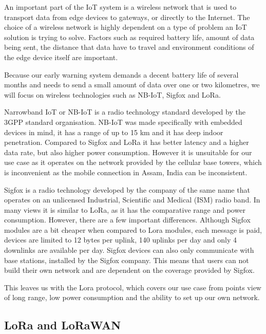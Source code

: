 An important part of the IoT system is a wireless network that is used to transport data from edge devices to gateways, or directly to the Internet.
The choice of a wireless network is highly dependent on a type of problem an IoT solution is trying to solve.
Factors such as required battery life, amount of data being sent, the distance that data have to travel and environment conditions of the edge device itself are important.

Because our early warning system demands a decent battery life of several months and needs to send a small amount of data over one or two kilometres, we will focus on wireless technologies such as NB-IoT, Sigfox and LoRa.

Narrowband IoT or NB-IoT is a radio technology standard developed by the 3GPP standard organisation\cite{lora_nbiot}.
NB-IoT was made specifically with embedded devices in mind, it has a range of up to 15 \si{\kilo\meter} and it has deep indoor penetration\cite{lora_nbiot}.
Compared to Sigfox and LoRa it has better latency and a higher data rate, but also higher power consumption\cite{lora_nbiot_sigfox}.
However it is unsuitable for our use case as it operates on the network provided by the cellular base towers, which is inconvenient as the mobile connection in Assam, India can be inconsistent\cite{wildlabs-elephants}.

Sigfox is a radio technology developed by the company of the same name that operates on an unlicensed Industrial, Scientific and Medical (ISM) radio band.
In many views it is similar to LoRa, as it has the comparative range and power consumption\cite{lora_nbiot_sigfox}.
However, there are a few important differences.
Although Sigfox modules are a bit cheaper when compared to Lora modules, each message is paid, devices are limited to 12 bytes per uplink, 140 uplinks per day and only 4 downlinks are available per day.
Sigfox devices can also only communicate with base stations, installed by the Sigfox company\cite{lora_nbiot_sigfox}.
This means that users can not build their own network and are dependent on the coverage provided by Sigfox.

This leaves us with the Lora protocol, which covers our use case from points view of long range, low power consumption and the ability to set up our own network. 


\subsection{ LoRa and LoRaWAN}

